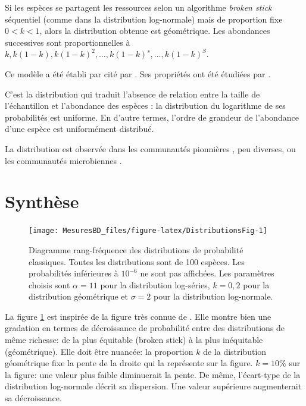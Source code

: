 \documentclass[
  11pt,
  american,
  a4paper,
  extrafontsizes,onecolumn,openright
  ]{memoir}
\begin{document}
Si les espèces se partagent les ressources selon un algorithme \emph{broken stick} séquentiel (comme dans la distribution log-normale) mais de proportion fixe \(0<k<1\), alors la distribution obtenue est géométrique.
Les abondances successives sont proportionnelles à \(k, k(1-k), k(1-k)^2, \dots, k(1-k)^s, \dots, k(1-k)^S\).

Ce modèle a été établi par \textcite{Motomura1932} cité par \textcite{May1975}.
Ses propriétés ont été étudiées par \textcite{Whittaker1972}.

C'est la distribution qui traduit l'absence de relation entre la taille de l'échantillon et l'abondance des espèces \autocite{Pueyo2007}: la distribution du logarithme de ses probabilités est uniforme.
En d'autre termes, l'ordre de grandeur de l'abondance d'une espèce est uniformément distribué.

La distribution est observée dans les communautés pionnières \autocite{Bazzaz1975}, peu diverses, ou les communautés microbiennes \autocite{Haegeman2013}.

\section{Synthèse}\label{synthuxe8se}



\scriptsize

\begin{figure}

{\centering \texttt{[image: MesuresBD\_files/figure-latex/DistributionsFig-1]} 

}

\caption{Diagramme rang-fréquence des distributions de probabilité classiques. Toutes les distributions sont de 100 espèces. Les probabilités inférieures à \(10^{-6}\) ne sont pas affichées. Les paramètres choisis sont \(\alpha=11\) pour la distribution log-séries, \(k=0,2\) pour la distribution géométrique et \(\sigma=2\) pour la distribution log-normale.}\label{fig:DistributionsFig}
\end{figure}

\normalsize

La figure \ref{fig:DistributionsFig} est inspirée de la figure très connue de \textcite{Magurran1988}.
Elle montre bien une gradation en termes de décroissance de probabilité entre des distributions de même richesse: de la plus équitable (broken stick) à la plus inéquitable (géométrique).
Elle doit être nuancée: la proportion \(k\) de la distribution géométrique fixe la pente de la droite qui la représente sur la figure.
\(k=10\%\) sur la figure: une valeur plus faible diminuerait la pente.
De même, l'écart-type de la distribution log-normale décrit sa dispersion.
Une valeur supérieure augmenterait sa décroissance.
\end{document}
